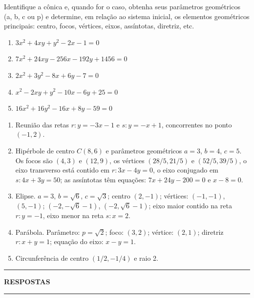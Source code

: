 \documentclass[12pt]{exam}
\begin{document}
\begin{exercicio}
    Identifique a cônica e, quando for o caso, obtenha seus parâmetros geométricos (a, b, c ou p) e determine, em relação ao sistema inicial, os elementos geométricos principais: centro, focos, vértices, eixos, assíntotas, diretriz, etc.
    \begin{enumerate}[label=({\alph*})]
        \item $3x^2 + 4xy + y^2 - 2x - 1 = 0$
        \item $7x^2 + 24xy - 256x - 192y + 1456 = 0$
        \item $2x^2 + 3y^2 - 8x + 6y - 7 = 0$
        \item $x^2 - 2xy + y^2 - 10x - 6y + 25 = 0$
        \item $16x^2 + 16y^2 - 16x + 8y - 59 = 0$
    \end{enumerate}
    \begin{solucao}
        \begin{enumerate}[label=({\alph*})]
            \item Reunião das retas $r: y = -3x - 1$ e $s: y = -x + 1$, concorrentes no ponto $(-1,2)$.
            \item Hipérbole de centro $C(8,6)$ e parâmetros geométricos $a = 3$, $b = 4$, $c = 5$. Os focos são $(4,3)$ e $(12,9)$, os vértices $(28/5,21/5)$ e $(52/5,39/5)$, o eixo transverso está contido em $r: 3x - 4y = 0$, o eixo conjugado em $s: 4x + 3y = 50$; as assíntotas têm equações: $7x + 24y - 200 = 0$ e $x - 8 = 0$.
            \item Elipse. $a = 3$, $b = \sqrt{6}$, $c = \sqrt{3}$; centro $(2,-1)$; vértices: $(-1,-1)$, $(5,-1)$; $(-2, - \sqrt{6} - 1)$, $(-2,\sqrt{6} - 1)$; eixo maior contido na reta $r: y = -1$, eixo menor na reta $s: x = 2$.
            \item Parábola. Parâmetro: $p = \sqrt{2}$; foco: $(3,2)$; vértice: $(2,1)$; diretriz $r: x + y = 1$; equação do eixo: $x - y = 1$.
            \item Circunferência de centro $(1/2,-1/4)$ e raio 2.
        \end{enumerate}
    \end{solucao}
\end{exercicio}

\newpage
{}
\hrule
\begin{center}
    {\large\bf RESPOSTAS}
\end{center}
\hrule

\end{document}
